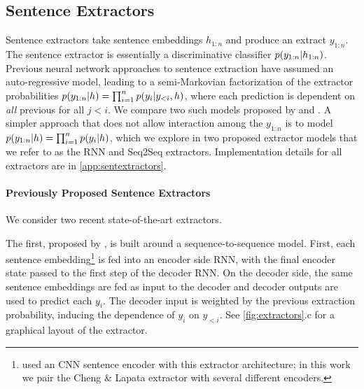 \subsection{Sentence Extractors} \label{sec:sext}



Sentence extractors take sentence embeddings $h_{1:n}$ and produce an extract $y_{1:n}$.
The sentence extractor is essentially a discriminative 
classifier $p(\slabel_{1:n} | \sentEmb_{1:n})$.
Previous neural network approaches to sentence extraction have assumed 
an auto-regressive model, leading to a semi-Markovian
factorization of the extractor probabilities 
$p(\slabel_{1:n}|\sentEmb)=\prod_{i=1}^\docSize 
p(\slabel[i]|\slabel[<i],\sentEmb)$,
where each prediction \slabel[i] is dependent on \emph{all} 
previous \slabel[j] for
all $j < i$. We compare two such models proposed by \citet{cheng2016neural}
and \citet{nallapati2017summarunner}.
A simpler approach that does not allow interaction among the $y_{1:n}$
is to 
  model $p(\slabel_{1:n}|\sentEmb) = \prod_{i=1}^n p(y_i|h)$, 
  which we explore in two proposed extractor models that we refer to as the RNN 
  and Seq2Seq extractors.
Implementation details for all extractors are in \autoref{app:sentextractors}.


\paragraph{Previously Proposed Sentence Extractors}
 We consider two recent state-of-the-art extractors.

 The first, proposed by 
\citet{cheng2016neural}, %
is built around a sequence-to-sequence model.
First, each sentence embedding\footnote{\citet{cheng2016neural} used an CNN sentence encoder with 
this extractor architecture; in this work we pair the Cheng \& Lapata extractor
with several different encoders.} is
fed into an encoder side RNN, with the final encoder state passed to the
first step of the decoder RNN. On the decoder side, the same sentence 
embeddings are fed as input to the decoder and decoder outputs are used to
predict each $y_i$. The decoder input is weighted by the previous extraction
probability, inducing the dependence of $y_i$ on $y_{<i}$.
See \autoref{fig:extractors}.c for a graphical layout of the extractor.

